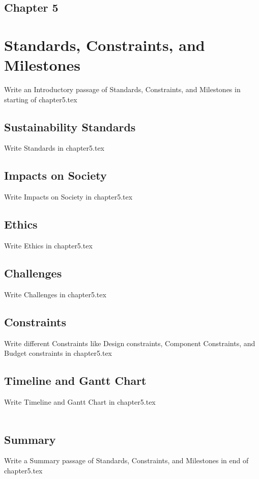 \begin{center}
    \section*{\fontsize{20}{20}\selectfont Chapter 5}
\end{center}
\vspace{10mm}

\section{Standards, Constraints, and  Milestones}

Write an Introductory passage of Standards, Constraints, and  Milestones in starting of chapter5.tex

\subsection{Sustainability Standards}
Write Standards in chapter5.tex

\subsection{Impacts on Society }
Write Impacts on Society in chapter5.tex

\subsection{Ethics}
Write Ethics in chapter5.tex

\subsection{Challenges}
Write Challenges in chapter5.tex

\subsection{Constraints}
Write different Constraints like Design constraints, Component Constraints, and Budget constraints in chapter5.tex

\subsection{Timeline and Gantt Chart}
Write Timeline and Gantt Chart in chapter5.tex
\\
\\
\subsection*{Summary}
Write a Summary passage of Standards, Constraints, and  Milestones in end of  chapter5.tex
